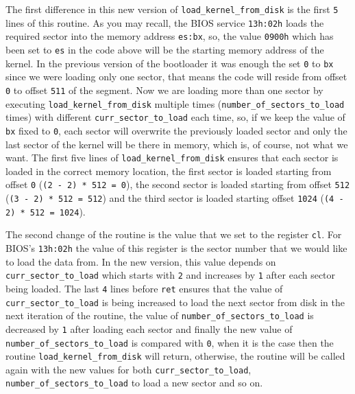 The first difference in this new version of
\lstinline!load_kernel_from_disk! is the first \lstinline!5! lines of
this routine. As you may recall, the BIOS service \lstinline!13h:02h!
loads the required sector into the memory address \lstinline!es:bx!, so,
the value \lstinline!0900h! which has been set to \lstinline!es! in the
code above will be the starting memory address of the kernel. In the
previous version of the bootloader it was enough the set \lstinline!0!
to \lstinline!bx! since we were loading only one sector, that means the
code will reside from offset \lstinline!0! to offset \lstinline!511! of
the segment. Now we are loading more than one sector by executing
\lstinline!load_kernel_from_disk! multiple times
(\lstinline!number_of_sectors_to_load! times) with different
\lstinline!curr_sector_to_load! each time, so, if we keep the value of
\lstinline!bx! fixed to \lstinline!0!, each sector will overwrite the
previously loaded sector and only the last sector of the kernel will be
there in memory, which is, of course, not what we want. The first five
lines of \lstinline!load_kernel_from_disk! ensures that each sector is
loaded in the correct memory location, the first sector is loaded
starting from offset \lstinline!0! (\lstinline!(2 - 2) * 512 = 0!), the
second sector is loaded starting from offset \lstinline!512!
(\lstinline!(3 - 2) * 512 = 512!) and the third sector is loaded
starting offset \lstinline!1024! (\lstinline!(4 - 2) * 512 = 1024!).

The second change of the routine is the value that we set to the
register \lstinline!cl!. For BIOS's \lstinline!13h:02h! the value of
this register is the sector number that we would like to load the data
from. In the new version, this value depends on
\lstinline!curr_sector_to_load! which starts with \lstinline!2! and
increases by \lstinline!1! after each sector being loaded. The last
\lstinline!4! lines before \lstinline!ret! ensures that the value of
\lstinline!curr_sector_to_load! is being increased to load the next
sector from disk in the next iteration of the routine, the value of
\lstinline!number_of_sectors_to_load! is decreased by \lstinline!1!
after loading each sector and finally the new value of
\lstinline!number_of_sectors_to_load! is compared with \lstinline!0!,
when it is the case then the routine \lstinline!load_kernel_from_disk!
will return, otherwise, the routine will be called again with the new
values for both \lstinline!curr_sector_to_load!,
\lstinline!number_of_sectors_to_load! to load a new sector and so on.

